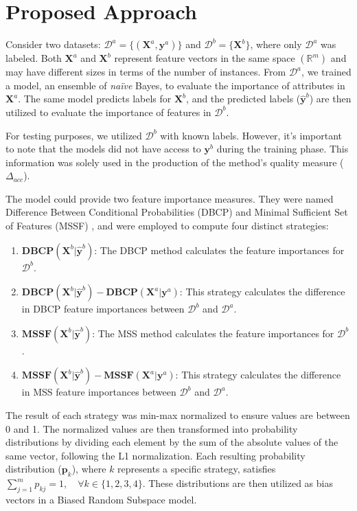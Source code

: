 \documentclass{article}
\begin{document}
\section{Proposed Approach}

Consider two datasets: $\mathcal{D}^a = \{ (\bm{X}^a, \bm{y}^a) \}$ and $\mathcal{D}^b = \{\bm{X}^b\}$, where only $\mathcal{D}^a$ was labeled. Both $\bm{X}^a$ and $\bm{X}^b$ represent feature vectors in the same space $(\mathbb{R}^m)$ and may have different sizes in terms of the number of instances. From $\mathcal{D}^a$, we trained a model, an ensemble  of \textit{na\"ive} Bayes, to evaluate the importance of attributes in $\bm{X}^a$. The same model predicts labels for $\bm{X}^b$, and the predicted labels ($\widehat{\bm{y}}^b$) are then utilized to evaluate the importance of features in $\mathcal{D}^b$.

For testing purposes, we utilized $\mathcal{D}^b$ with known labels. However, it's important to note that the models did not have access to $\bm{y}^b$ during the training phase. This information was solely used in the production of the method's quality measure ($\Delta_{acc}$).

The model could provide two feature importance measures. They were named Difference Between Conditional Probabilities (DBCP) and Minimal Sufficient Set of Features (MSSF) \cite{maia2023}, and were employed to compute four distinct strategies:

\begin{enumerate}
	\item $\textbf{DBCP}(\bm{X}^b|\widehat{\bm{y}}^b)$: The DBCP method calculates the feature importances for $\mathcal{D}^b$.
	\item $\textbf{DBCP}(\bm{X}^b|\widehat{\bm{y}}^b)-\textbf{DBCP}(\bm{X}^a|\bm{y}^a)$: This strategy calculates the difference in DBCP feature importances between $\mathcal{D}^b$ and $\mathcal{D}^a$.
	\item $\textbf{MSSF}(\bm{X}^b|\widehat{\bm{y}}^b)$: The MSS method calculates the feature importances for $\mathcal{D}^b$.
	\item $\textbf{MSSF}(\bm{X}^b|\widehat{\bm{y}}^b)-\textbf{MSSF}(\bm{X}^a|\bm{y}^a)$: This strategy calculates the difference in MSS feature importances between $\mathcal{D}^b$ and $\mathcal{D}^a$.
\end{enumerate}

The result of each strategy was min-max normalized to ensure values are between 0 and 1. The normalized values are then transformed into probability distributions by dividing each element by the sum of the absolute values of the same vector, following the L1 normalization. Each resulting probability distribution ($\bm{p}_{k}$), where $k$ represents a specific strategy, satisfies $\sum_{j =1}^{m}p_{kj}=1, \quad \forall k \in \{1,2,3,4\}$. These distributions are then utilized as bias vectors in a Biased Random Subspace model.
\end{document}
